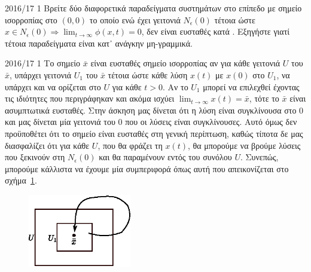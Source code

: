 \begin{exercise}{2016/17 1}
    Βρείτε δύο διαφορετικά παραδείγματα συστημάτων στο επίπεδο με σημείο
    ισορροπίας στο \( (0, 0) \) το οποίο ενώ έχει γειτονιά \( N_{\epsilon}(0) \)
    τέτοια ώστε \( x \in N_{\epsilon}(0) \Rightarrow \lim_{t \to \infty} \phi(x,
    t) = 0 \), δεν είναι ευσταθές κατά . Εξηγήστε γιατί τέτοια
    παραδείγματα είναι κατ᾽ ανάγκην μη-γραμμικά.
\end{exercise}
\begin{solution}{2016/17 1}
    Το σημείο \( \bar{x} \) είναι ευσταθές σημείο ισορροπίας αν για κάθε
    γειτονιά \( U \) του \( \bar{x} \), υπάρχει γειτονιά \( U_1 \) του
    \( \bar{x} \) τέτοια ώστε κάθε λύση \( x(t) \) με \( x(0) \) στο \( U_1 \),
    να υπάρχει και να ορίζεται στο \( U \) για κάθε \( t > 0 \). Αν το \( U_1 \)
    μπορεί να επιλεχθεί έχοντας τις ιδιότητες που περιγράφηκαν και ακόμα ισχύει
    \( \lim_{t \to \infty} x(t) = \bar{x} \), τότε το \( \bar{x} \) είναι
    ασυμπτωτικά ευσταθές. Στην άσκηση μας δίνεται ότι η λύση είναι
    συγκλίνουσα στο \( 0 \) και μας δίνεται μία γειτονιά του \( 0 \) που
    οι λύσεις είναι συγκλίνουσες. Αυτό όμως δεν προϋποθέτει ότι το σημείο
    είναι ευσταθές στη γενική περίπτωση, καθώς τίποτα δε μας διασφαλίζει ότι
    για κάθε \( U \), που θα φράζει τη \( x(t) \), θα μπορούμε να βρούμε λύσεις
    που ξεκινούν στη \( N_{\epsilon}(0) \) και θα παραμένουν εντός του συνόλου
    \( U \). Συνεπώς, μπορούμε κάλλιστα να έχουμε μία συμπεριφορά όπως
    αυτή που απεικονίζεται στο σχήμα~\ref{fig:ex1_unstable_convergent}.
    \begin{figure}[h]
        \centering
        \includegraphics[width=0.4\textwidth]{figures/ex1_unstable_convergent.eps}
        \caption{}
        \label{fig:ex1_unstable_convergent}
    \end{figure}


\end{solution}
